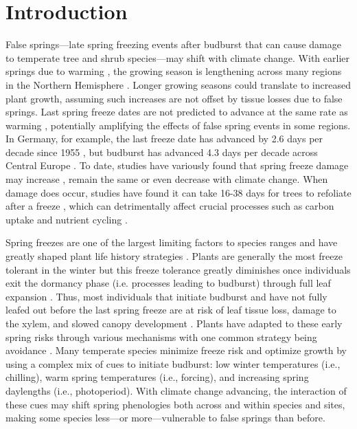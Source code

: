\documentclass{article}\usepackage[]{graphicx}\usepackage[]{color}
\begin{document}
\section*{Introduction} %
False springs---late spring freezing events after budburst that can cause damage to temperate tree and shrub species---may shift with climate change. With earlier springs due to warming \citep{Wolkovich2012,IPCC2014}, the growing season is lengthening across many regions in the Northern Hemisphere \citep{Chen2005,Liu2006, Kukal2018}. Longer growing seasons could translate to increased plant growth, assuming such increases are not offset by tissue losses due to false springs. Last spring freeze dates are not predicted to advance at the same rate as warming \citep{Inouye2008,Martin2010,Labe2016,Wypych2016a,Sgubin2018}, potentially amplifying the effects of false spring events in some regions. In Germany, for example, the last freeze date has advanced by 2.6 days per decade since 1955 \citep{Zohner2016}, but budburst has advanced 4.3 days per decade across Central Europe \citep{Fu2014,Vitasse2018}. To date, studies have variously found that spring freeze damage may increase \citep{Hannenin1991,Augspurger2013,Labe2016}, remain the same \citep{Scheifinger2003} or even decrease \citep{Kramer1994, Vitra2017} with climate change. When damage does occur, studies have found it can take 16-38 days for trees to refoliate after a freeze \citep{Gu2008,Augspurger2009, Augspurger2013, Menzel2015}, which can detrimentally affect crucial processes such as carbon uptake and nutrient cycling \citep{Hufkens2012,Richardson2013,Klosterman2018}.  

Spring freezes are one of the largest limiting factors to species ranges and have greatly shaped plant life history strategies \citep{Kollas2014}. Plants are generally the most freeze tolerant in the winter but this freeze tolerance greatly diminishes once individuals exit the dormancy phase (i.e. processes leading to budburst) through full leaf expansion \citep{Vitasse2014,Lenz2016}. Thus, most individuals that initiate budburst and have not fully leafed out before the last spring freeze are at risk of leaf tissue loss, damage to the xylem, and slowed canopy development \citep{Gu2008,Hufkens2012}. Plants have adapted to these early spring risks through various mechanisms with one common strategy being avoidance \citep{Vitasse2014}. Many temperate species minimize freeze risk and optimize growth by using a complex mix of cues to initiate budburst: low winter temperatures (i.e., chilling), warm spring temperatures (i.e., forcing), and increasing spring daylengths (i.e., photoperiod). With climate change advancing, the interaction of these cues may shift spring phenologies both across and within species and sites, making some species less---or more---vulnerable to false springs than before.
\end{document}
